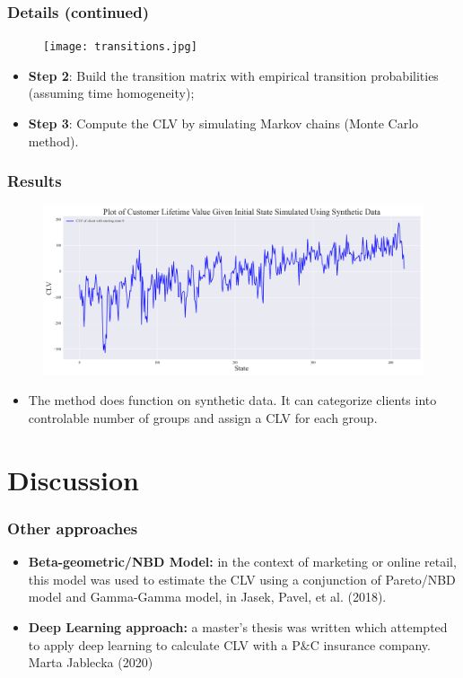 \documentclass[aspectratio=169,xcolor=x11names,compress]{beamer}
\begin{document}
\begin{frame}
\frametitle{Details (continued)}

\begin{figure}
	\texttt{[image: transitions.jpg]}
\end{figure}
	
\begin{itemize}
	\item \textbf{Step 2}: Build the transition matrix with empirical transition probabilities (assuming time homogeneity);
	\item \textbf{Step 3}: Compute the CLV by simulating Markov chains (Monte Carlo method).
\end{itemize}
\end{frame}

\begin{frame}
  \frametitle{Results}
  
  \begin{figure}
    \includegraphics[scale = 0.3]{result_plot.png}
  \end{figure}
    
  \begin{itemize}
    \item The method does function on synthetic data. It can categorize clients into controlable number of groups and assign a CLV for each group.
  \end{itemize}
  \end{frame}

\section{Discussion}

\begin{frame}
\frametitle{Other approaches}

\begin{itemize}
\item \textbf{Beta-geometric/NBD Model:} in the context of marketing or online retail, this model was used to estimate the CLV using a conjunction of Pareto/NBD model and Gamma-Gamma model, in Jasek, Pavel, et al. (2018).
\item \textbf{Deep Learning approach:} a master's thesis was written which attempted to apply deep learning to calculate CLV with a P$\&$C insurance company. Marta Jablecka (2020)
\end{itemize}

\end{frame}
\end{document}
